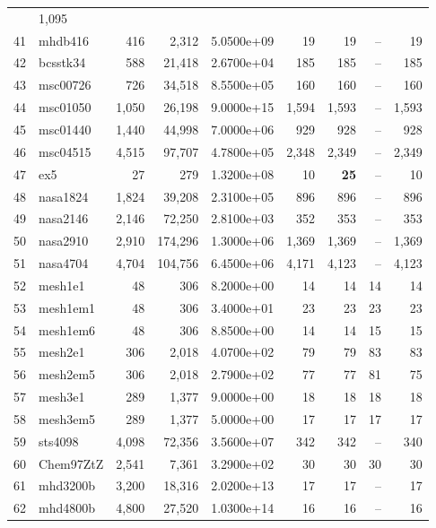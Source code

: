 \begin{table}[p]
\begin{center}
\begin{tabular}{rlrrr||rrrr}
 & 1,095 \\
 41 &    mhdb416 &  416 &     2,312 & 5.0500e+09 &  19 &   19 &  -- &   19 \\
 42 &   bcsstk34 &  588 &    21,418 & 2.6700e+04 & 185 &  185 &  -- &  185 \\
 43 &   msc00726 &  726 &    34,518 & 8.5500e+05 & 160 &  160 &  -- &  160 \\
 44 &   msc01050 & 1,050 &    26,198 & 9.0000e+15 &1,594 & 1,593 &  -- & 1,593 
 \\
 45 &   msc01440 & 1,440 &    44,998 & 7.0000e+06 & 929 &  928 &  -- &  928 \\
 46 &   msc04515 & 4,515 &    97,707 & 4.7800e+05 &2,348 & 2,349 &  -- & 2,349 
 \\
 47 &        ex5 &   27 &      279 & 1.3200e+08 &  10 & \textbf{  25} &  -- &   
 10 \\
 48 &   nasa1824 & 1,824 &    39,208 & 2.3100e+05 & 896 &  896 &  -- &  896 \\
 49 &   nasa2146 & 2,146 &    72,250 & 2.8100e+03 & 352 &  353 &  -- &  353 \\
 50 &   nasa2910 & 2,910 &   174,296 & 1.3000e+06 &1,369 & 1,369 &  -- & 1,369 
 \\
 51 &   nasa4704 & 4,704 &   104,756 & 6.4500e+06 &4,171 & 4,123 &  -- & 4,123 
 \\
 52 &    mesh1e1 &   48 &      306 & 8.2000e+00 &  14 &   14 &   14 &   14 \\
 53 &   mesh1em1 &   48 &      306 & 3.4000e+01 &  23 &   23 &   23 &   23 \\
 54 &   mesh1em6 &   48 &      306 & 8.8500e+00 &  14 &   14 &   15 &   15 \\
 55 &    mesh2e1 &  306 &     2,018 & 4.0700e+02 &  79 &   79 &   83 &   83 \\
 56 &   mesh2em5 &  306 &     2,018 & 2.7900e+02 &  77 &   77 &   81 &   75 \\
 57 &    mesh3e1 &  289 &     1,377 & 9.0000e+00 &  18 &   18 &   18 &   18 \\
 58 &   mesh3em5 &  289 &     1,377 & 5.0000e+00 &  17 &   17 &   17 &   17 \\
 59 &    sts4098 & 4,098 &    72,356 & 3.5600e+07 & 342 &  342 &  -- &  340 \\
 60 &  Chem97ZtZ & 2,541 &     7,361 & 3.2900e+02 &  30 &   30 &   30 &   30 \\
 61 &   mhd3200b & 3,200 &    18,316 & 2.0200e+13 &  17 &   17 &  -- &   17 \\
 62 &   mhd4800b & 4,800 &    27,520 & 1.0300e+14 &  16 &   16 &  -- &   16 \\

\end{tabular}
\end{center}
\end{table}
